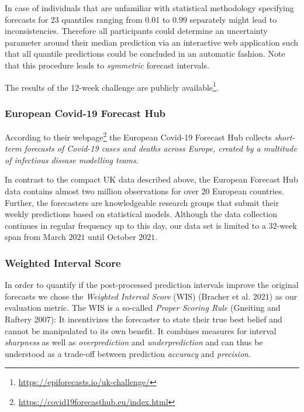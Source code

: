 \documentclass[
]{article}
\DeclareRobustCommand{\href}[2]{#2\footnote{\url{#1}}}
\begin{document}
In case of individuals that are unfamiliar with statistical methodology specifying forecasts for \(23\) quantiles ranging from 0.01 to 0.99 separately might lead to inconsistencies.
Therefore all participants could determine an uncertainty parameter around their median prediction via an interactive web application such that all quantile predictions could be concluded in an automatic fashion.
Note that this procedure leads to \emph{symmetric} forecast intervals.

The results of the 12-week challenge are \href{https://epiforecasts.io/uk-challenge/}{publicly available}.

\hypertarget{european-covid-19-forecast-hub}{%
\subsubsection{European Covid-19 Forecast Hub}\label{european-covid-19-forecast-hub}}

According to their \href{https://covid19forecasthub.eu/index.html}{webpage} the European Covid-19 Forecast Hub collects \emph{short-term forecasts of Covid-19 cases and deaths across Europe, created by a multitude of infectious disease modelling teams}.

In contrast to the compact UK data described above, the European Forecast Hub data contains almost two million observations for over \(20\) European countries.
Further, the forecasters are knowledgeable research groups that submit their weekly predictions based on statistical models.
Although the data collection continues in regular frequency up to this day, our data set is limited to a \(32\)-week span from March \(2021\) until October \(2021\).

\hypertarget{weighted-interval-score}{%
\subsubsection{Weighted Interval Score}\label{weighted-interval-score}}

In order to quantify if the post-processed prediction intervals improve the original forecasts we chose the \emph{Weighted Interval Score} (WIS) (Bracher et al. 2021) as our evaluation metric.
The WIS is a so-called \emph{Proper Scoring Rule} (Gneiting and Raftery 2007): It incentivizes the forecaster to state their true best belief and cannot be manipulated to its own benefit.
It combines measures for interval \emph{sharpness} as well as \emph{overprediction} and \emph{underprediction} and can thus be understood as a trade-off between prediction \emph{accuracy} and \emph{precision}.
\end{document}
